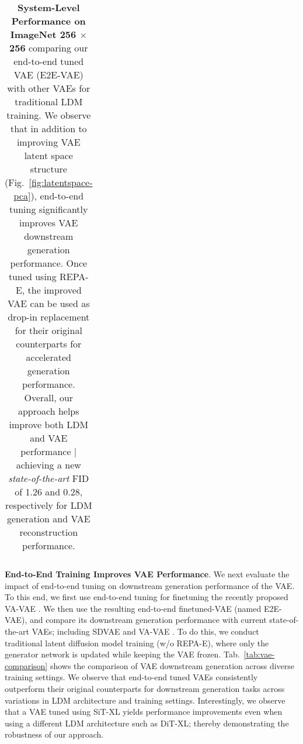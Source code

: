 \documentclass[10pt,twocolumn,letterpaper]{article}
\begin{document}
\begin{table*}[ht!]
{\begin{tabular}{l|l|c|c|c|ccccc|ccccc}
\bottomrule
\end{tabular}}
\caption{\textbf{System-Level Performance on ImageNet 256 $\times$ 256}
comparing our end-to-end tuned VAE (E2E-VAE) with other VAEs for traditional LDM training. We observe that in addition to improving VAE latent space structure (Fig.~\ref{fig:latentspace-pca}), end-to-end tuning significantly improves VAE downstream generation performance. Once tuned using REPA-E, the improved VAE can be used as drop-in replacement for their original counterparts for accelerated generation performance. Overall, our approach helps improve both LDM and VAE performance | achieving a new \emph{state-of-the-art} FID of 1.26 and 0.28, respectively for LDM generation and VAE reconstruction performance.}
\label{tab:comparison_e2e_vae}
\end{table*}
 
\textbf{End-to-End Training Improves VAE Performance}. 
We next evaluate the impact of end-to-end tuning on downstream generation performance of the VAE. To this end, we first use end-to-end tuning for finetuning the recently proposed VA-VAE \cite{ldit}. We then use the resulting end-to-end finetuned-VAE (named E2E-VAE), and compare its downstream generation performance with current state-of-the-art VAEs; including SDVAE \cite{ldm} and VA-VAE \cite{ldit}.
To do this, we conduct traditional latent diffusion model training (w/o REPA-E), where only the generator network is updated while keeping the VAE frozen. Tab.~\ref{tab:vae-comparison} shows the comparison of VAE downstream generation across diverse training settings. We observe that end-to-end tuned VAEs consistently outperform their original counterparts for downstream generation tasks across variations in LDM architecture and training settings. Interestingly, we observe that a VAE tuned using SiT-XL yields performance improvements even when using a different LDM architecture such as  DiT-XL; thereby demonstrating the robustness of our approach.
\end{document}
